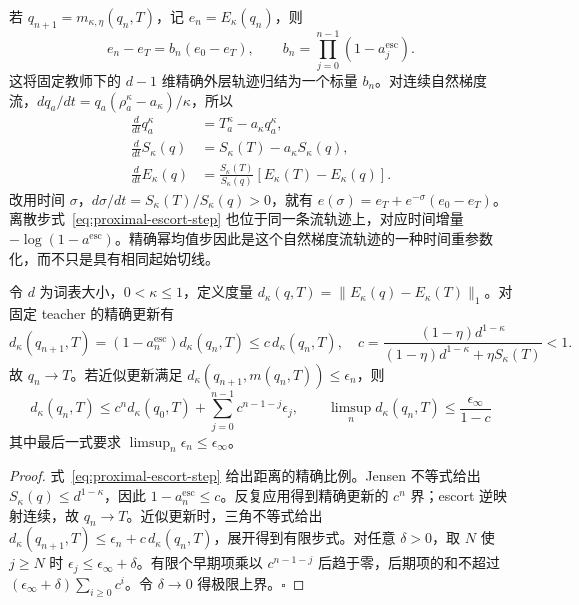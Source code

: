 \documentclass[lang=cn,scheme=chinese,openany]{../book/elegantbook}
\begin{document}
若 $q_{n+1}=m_{\kappa,\eta}(q_n,T)$，记 $e_n=E_\kappa(q_n)$，则
\begin{equation}
 e_n-e_T=b_n(e_0-e_T),\qquad
 b_n=\prod_{j=0}^{n-1}(1-a_j^{\mathrm{esc}}).
 \label{eq:proximal-escort-orbit}
\end{equation}
这将固定教师下的 $d-1$ 维精确外层轨迹归结为一个标量 $b_n$。对连续自然梯度流，$dq_a/dt=q_a(\rho_a^\kappa-a_\kappa)/\kappa$，所以
\begin{align}
 \frac{d}{dt}q_a^\kappa&=T_a^\kappa-a_\kappa q_a^\kappa,\\
 \frac{d}{dt}S_\kappa(q)&=S_\kappa(T)-a_\kappa S_\kappa(q),\\
 \frac{d}{dt}E_\kappa(q)&=\frac{S_\kappa(T)}{S_\kappa(q)}[E_\kappa(T)-E_\kappa(q)].
\end{align}
改用时间 $\sigma$，$d\sigma/dt=S_\kappa(T)/S_\kappa(q)>0$，就有 $e(\sigma)=e_T+e^{-\sigma}(e_0-e_T)$。离散步式~\eqref{eq:proximal-escort-step} 也位于同一条流轨迹上，对应时间增量 $-\log(1-a^{\mathrm{esc}})$。精确幂均值步因此是这个自然梯度流轨迹的一种时间重参数化，而不只是具有相同起始切线。

\begin{theorem}
\label{thm:proximal-escort-contraction}
令 $d$ 为词表大小，$0<\kappa\le1$，定义度量 $d_\kappa(q,T)=\|E_\kappa(q)-E_\kappa(T)\|_1$。对固定 teacher 的精确更新有
\begin{equation}
 d_\kappa(q_{n+1},T)=(1-a_n^{\mathrm{esc}})d_\kappa(q_n,T)\le c\,d_\kappa(q_n,T),\quad
 c=\frac{(1-\eta)d^{1-\kappa}}{(1-\eta)d^{1-\kappa}+\eta S_\kappa(T)}<1.
\end{equation}
故 $q_n\to T$。若近似更新满足 $d_\kappa(q_{n+1},m(q_n,T))\le\epsilon_n$，则
\begin{equation}
 d_\kappa(q_n,T)\le c^nd_\kappa(q_0,T)+\sum_{j=0}^{n-1}c^{n-1-j}\epsilon_j,
 \qquad
 \limsup_nd_\kappa(q_n,T)\le\frac{\epsilon_\infty}{1-c}
\end{equation}
其中最后一式要求 $\limsup_n\epsilon_n\le\epsilon_\infty$。
\end{theorem}

\begin{proof}
式~\eqref{eq:proximal-escort-step} 给出距离的精确比例。Jensen 不等式给出 $S_\kappa(q)\le d^{1-\kappa}$，因此 $1-a_n^{\mathrm{esc}}\le c$。反复应用得到精确更新的 $c^n$ 界；escort 逆映射连续，故 $q_n\to T$。近似更新时，三角不等式给出 $d_\kappa(q_{n+1},T)\le\epsilon_n+c\,d_\kappa(q_n,T)$，展开得到有限步式。对任意 $\delta>0$，取 $N$ 使 $j\ge N$ 时 $\epsilon_j\le\epsilon_\infty+\delta$。有限个早期项乘以 $c^{n-1-j}$ 后趋于零，后期项的和不超过 $(\epsilon_\infty+\delta)\sum_{i\ge0}c^i$。令 $\delta\to0$ 得极限上界。\hfill$\square$
\end{proof}
\end{document}
